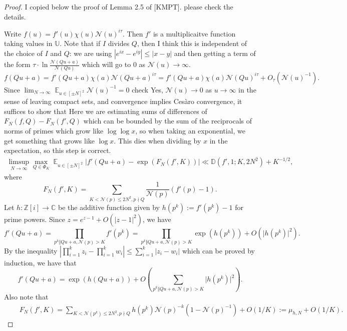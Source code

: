 \documentclass[11pt]{amsart}
\theoremstyle{definition}
\DeclareMathOperator*{\E}{\mathbb{E}}
\newcommand{\C}{{\mathbb C}}
\newcommand{\D}{{\mathbb D}}
\newcommand{\NN}{{\mathcal N}}
\newcommand{\Z}{{\mathbb Z}}
\newcommand{\U}{{\mathbb U}}
\begin{document}
\begin{proof}

    {\color{red} I copied below the proof of Lemma 2.5 of [KMPT]. please check the details.}

    Write $f(u)=f'(u)\chi(u)\NN(u)^{i\tau}$. Then $f'$ is a multiplicaitve function taking values in $\U$. Note that if $I$ divides $Q$, then {\color{blue} I think this is independent of the choice of $I$ and $Q$: we are using $|e^{ix}-e^{iy}| \leq |x-y|$ and then getting a term of the form $\tau\cdot \ln \frac{\NN(Qu+a)}{\NN(Qu)}$ which will go to $0$ as $\NN(u) \to \infty$.}
    $$f(Qu+a)=f'(Qu+a)\chi(a)\NN(Qu+a)^{i\tau}=f'(Qu+a)\chi(a)\NN(Qu)^{i\tau}+O_{\tau}(\NN(u)^{-1}).$$
    Since $\lim_{N\to\infty}\E_{u\in[\pm N]^{2}}\NN(u)^{-1}=0$ {\color{red} check} {\color{blue} Yes, $\NN(u) \to 0$ as $u \to \infty$ in the sense of leaving compact sets, and convergence implies Ces\`aro convergence}, it suffices to show that {\color{blue} Here we are estimating sums of differences of $F_N(f,Q)-F_N(f',Q)$ which can be bounded by the sum of the reciprocals of norms of primes which grow like $\log \log x$, so when taking an exponential, we get something that grows like $\log x$. This dies when dividing by $x$ in the expectation, so this step is correct.}
\begin{equation}
    \begin{split}
        \limsup_{N\to\infty}\max_{Q\in \Phi_{K}}\E_{u\in[\pm N]^{2}}\vert f'(Qu+a)-\exp(F_{N}(f',K))\vert\ll \D(f',1;K,2N^{2})+K^{-1/2},
    \end{split}
\end{equation}
where $$F_{N}(f',K)=\sum_{K<\NN(p)\leq 2N^{2}, p\nmid Q}\frac{1}{\NN(p)}(f'(p)-1).$$
Let $h\colon\Z[i]\to\C$ be the additive function given by $h(p^{k}):=f'(p^{k})-1$ for prime powers. Since $z=e^{z-1}+O(\vert z-1\vert^{2})$, we have
$$f'(Qu+a)=\prod_{p^{k}\Vert Qu+a, \NN(p)>K} f'(p^{k})=\prod_{p^{k}\Vert Qu+a, \NN(p)>K}\exp(h(p^{k}))+O(\vert h(p^{k})\vert^{2}).$$
By the inequality $\left|\prod_{i=1}^{k}z_{i}-\prod_{i=1}^{k}w_{i}\right|\leq\sum_{i=1}^{k}\vert z_{i}-w_{i}\vert$ which can be proved by induction, we have that
$$f'(Qu+a)=\exp(h(Qu+a))+O\left(\sum_{p^{k}\Vert Qu+a, \NN(p)>K}\vert h(p^{k})\vert^{2}\right).$$
Also
note that
\begin{equation}
    \begin{split}
        &\quad F_{N}(f',K)=\sum_{K<\NN(p^{k})\leq 2N^{2}, p \nmid Q}h(p^{k})\NN(p)^{-k}(1-\NN(p)^{-1})+O(1/K):=\mu_{h,N}+O(1/K).
    \end{split}
\end{equation}

\end{proof}
\end{document}
